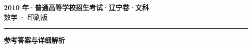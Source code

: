 \documentclass[zihao=5, a4paper]{ctexart}
\begin{document}
\begin{center}
  {\Large\bfseries 2010 年·普通高等学校招生考试·辽宁卷·文科}\\[4pt]
  {\large 数学 · 印刷版}
\end{center}
\medskip
{}

\par\bigskip\hrule\bigskip
{}
\begin{center}{\large\bfseries 参考答案与详细解析}\end{center}
\smallskip

\end{document}

